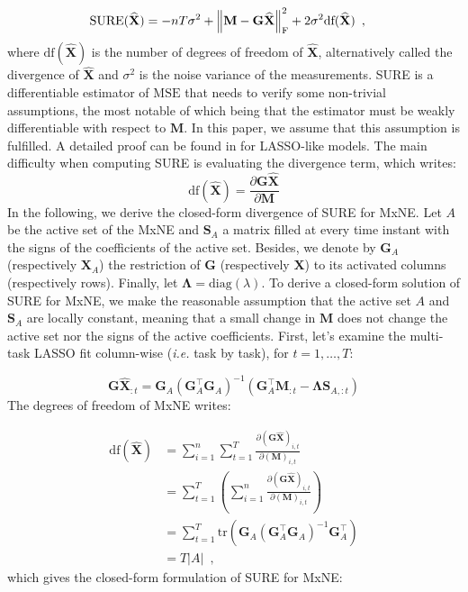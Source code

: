 \begin{align} \label{eq:7}
    \text{SURE}(\widehat{\mathbf{X}})
    &= -nT\sigma^2 + \left \lVert 
        \mathbf{M} - \mathbf{G}\widehat{\mathbf{X}}
     \right \rVert_{\text{F}}^2
    + 2 \sigma^2 \text{df}(\widehat{\mathbf{X}})
    \enspace ,
\end{align}
%
where $\text{df}(\widehat{\mathbf{X}})$ is the number of degrees of freedom of $\widehat{\mathbf{X}}$,
alternatively called the divergence of $\widehat{\mathbf{X}}$ and $\sigma^2$ is the noise variance of the measurements. 
SURE is a differentiable estimator of $\text{MSE}$ that needs to verify some non-trivial assumptions, 
the most notable of which being that the estimator must be weakly differentiable with respect to $\mathbf{M}$. 
In this paper, we assume that this assumption is fulfilled. A detailed proof can be found in \cite{Zou_Hastie_Tibshirani07}
for LASSO-like models. The main difficulty when computing SURE is evaluating the divergence term, which writes:
%
\begin{equation*}
    \text{df}(\widehat{\mathbf{X}}) 
    = 
    \frac{
        \partial \mathbf{G} \widehat{\mathbf{X}}
    }{
        \partial \mathbf{M}
    }
\end{equation*}
%
In the following, we derive the closed-form divergence of SURE for MxNE. Let $A$ be the active set 
of the MxNE and $\mathbf{S}_A$ a matrix filled at every time instant with the signs of the coefficients of the active set. 
Besides, we denote by $\mathbf{G}_A$ (respectively $\mathbf{X}_A$) the restriction of $\mathbf{G}$ (respectively $\mathbf{X}$) to its activated
columns (respectively rows). Finally, let $\mathbf{\Lambda} = \text{diag}(\lambda)$.
To derive a closed-form solution of SURE for MxNE, we make the reasonable assumption that the active set $A$ and $\mathbf{S}_A$ are locally constant, 
meaning that a small change in $\mathbf{M}$ does not change the active set nor the signs of the active 
coefficients. First, let's examine the multi-task LASSO fit column-wise (\textit{i.e.} task by task), for 
$t = 1, \dots, T$:

\begin{equation*}
    \mathbf{G\widehat{X}}_{:t} 
    = \mathbf{G}_A (\mathbf{G}_A^{\top}\mathbf{G}_A)^{-1}
    \left(
        \mathbf{G}^{\top}_{A}\mathbf{M}_{:t}
        -
        \mathbf{\Lambda} \mathbf{S}_{A, :t}
    \right)
\end{equation*}
%
The degrees of freedom of MxNE writes:

\begin{align*}
    \text{df}(\widehat{\mathbf{X}}) 
    &= \sum_{i=1}^n \sum_{t=1}^T
    \frac{\partial (\mathbf{G}\widehat{\mathbf{X}})_{i,t}}{\partial (\mathbf{M})_{i, t}} \\
    &= \sum_{t=1}^T \left(
        \sum_{i=1}^n \frac{\partial (\mathbf{G}\widehat{\mathbf{X}})_{i,t}}{\partial (\mathbf{M})_{i, t}} 
    \right) \\
    &= \sum_{t=1}^T \text{tr}(\mathbf{G}_A (\mathbf{G}_A^{\top}\mathbf{G}_A)^{-1}\mathbf{G}_A^{\top}) \\
    &= T \lvert A \rvert
    \enspace ,
\end{align*}
%
which gives the closed-form formulation of SURE for MxNE:

